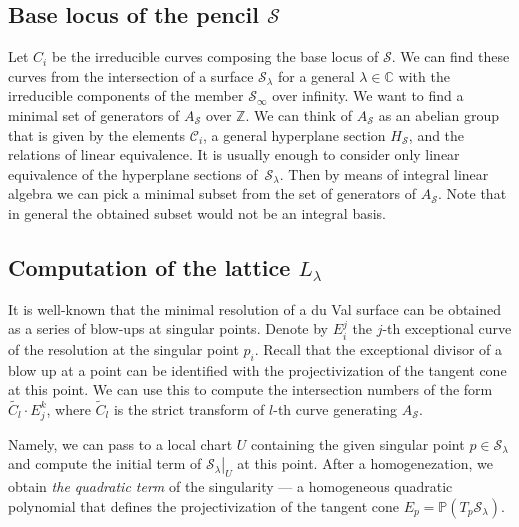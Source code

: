 \documentclass[10pt]{amsart}
\numberwithin{equation}{section}
\theoremstyle{plain}
\theoremstyle{definition}
\theoremstyle{remark}
\begin{document}
\subsection{Base locus of the pencil \texorpdfstring{\(\mathcal{S}\)}{S}}

Let \(C_i\) be the irreducible curves composing the base locus of \(\mathcal{S}\). We can find these curves from the intersection of a surface \(\mathcal{S}_{\lambda}\) for a general \(\lambda \in \mathbb{C}\) with the irreducible components of the member \(\mathcal{S}_{\infty}\) over infinity. We want to find a minimal set of generators of \(A_{\mathcal{S}}\) over \(\mathbb{Z}\). We can think of \(A_{\mathcal{S}}\) as an abelian group that is given by the elements \(\mathcal{C}_i\), a general hyperplane section \(H_{\mathcal{S}}\), and the relations of linear equivalence. It is usually enough to consider only linear equivalence of the hyperplane sections of~\(\mathcal{S}_{\lambda}\). Then by means of integral linear algebra we can pick a minimal subset from the set of generators of \(A_{\mathcal{S}}\). Note that in general the obtained subset would not be an integral basis.

\subsection{Computation of the lattice \texorpdfstring{\(L_{\lambda}\)}{L\_l}}\label{subsection:algorithm}

It is well-known that the minimal resolution of a du Val surface can be obtained as a series of blow-ups at singular points. Denote by \(E_i^j\) the \(j\)-th exceptional curve of the resolution at the singular point \(p_i\). Recall that the exceptional divisor of a blow up at a point can be identified with the projectivization of the tangent cone at this point. We can use this to compute the intersection numbers of the form \(\widetilde{C_l} \cdot E_j^k\), where \(\widetilde{C}_l\) is the strict transform of \(l\)-th curve generating \(A_{\mathcal{S}}\).

Namely, we can pass to a local chart \(U\) containing the given singular point \(p \in \mathcal{S}_{\lambda}\) and compute the initial term of \(\left. \mathcal{S}_{\lambda} \right|_U\) at this point. After a homogenezation, we obtain \emph{the quadratic term} of the singularity --- a homogeneous quadratic polynomial that defines the projectivization of the tangent cone \(E_p = \mathbb{P}(T_p \mathcal{S}_{\lambda})\).
\end{document}
